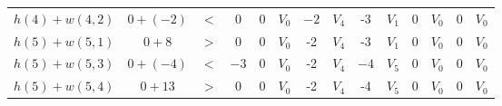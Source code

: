 \documentclass[../tp2_grupo404.tex]{subfiles}
\begin{document}
\begin{table}[H]
\begin{tabular}{@{}cccccccccccccc@{}}
    $h(4)+w(4,2)$ & {\color[HTML]{9A0000} $0+(-2)$} & {\color[HTML]{9A0000} $<$} & {\color[HTML]{9A0000} $0$}  & 0 & $V_0$ & {\color[HTML]{9A0000} $-2$} & {\color[HTML]{9A0000} $V_4$} & -3                          & $V_1$                               & 0 & $V_0$ & 0 & $V_0$ \\
    $h(5)+w(5,1)$ & $0+8$                           & $>$                        & 0                           & 0 & $V_0$ & -2                          & $V_4$                        & -3                          & $V_1$                               & 0 & $V_0$ & 0 & $V_0$ \\
    $h(5)+w(5,3)$ & {\color[HTML]{9A0000} $0+(-4)$} & {\color[HTML]{9A0000} $<$} & {\color[HTML]{9A0000} $-3$} & 0 & $V_0$ & -2                          & $V_4$                        & {\color[HTML]{9A0000} $-4$} & {\color[HTML]{9A0000} $V_5$}        & 0 & $V_0$ & 0 & $V_0$ \\
    $h(5)+w(5,4)$ & $0+13$                          & $>$                        & 0                           & 0 & $V_0$ & -2                          & $V_4$                        & -4                          & $V_5$                               & 0 & $V_0$ & 0 & $V_0$ \\ \bottomrule
    \end{tabular}
    \label{EjFord1}
\end{table}
\end{document}
